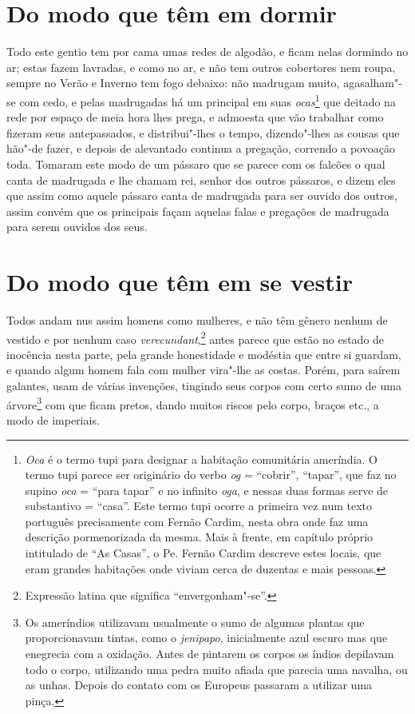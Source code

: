 \section{Do modo que têm em dormir} 
Todo este gentio tem por cama umas redes de algodão, e ficam
nelas dormindo no ar; estas fazem lavradas, e como no ar, e não tem
outros cobertores nem roupa, sempre no Verão e Inverno tem fogo
debaixo: não madrugam muito, agasalham"-se com cedo, e pelas madrugadas
há um principal em suas \textit{ocas}\footnote{ \textit{Oca} é o
termo tupi para designar a habitação comunitária ameríndia. O termo
tupi parece ser originário do verbo \textit{og} = ``cobrir'', ``tapar'',
que faz no supino \textit{oca} = ``para tapar'' e no infinito
\textit{oga}, e nessas duas formas serve de substantivo = ``casa''. 
Este termo tupi ocorre a primeira vez num texto português
precisamente com Fernão Cardim, nesta obra onde faz uma descrição
pormenorizada da mesma. Mais à frente, em capítulo próprio intitulado
de ``As Casas'', o Pe. Fernão Cardim descreve estes locais, que
eram grandes habitações onde viviam cerca de duzentas e mais pessoas.} 
que deitado na rede por espaço de meia hora lhes prega, e admoesta que
vão trabalhar como fizeram seus antepassados, e distribui"-lhes o tempo,
dizendo"-lhes as cousas que hão"-de fazer, e depois de alevantado
continua a pregação, correndo a povoação toda. Tomaram este modo de um
pássaro que se parece com os falcões o qual canta de madrugada e lhe
chamam rei, senhor dos outros pássaros, e dizem eles que assim como
aquele pássaro canta de madrugada para ser ouvido dos outros, assim
convém que os principais façam aquelas falas e pregações de madrugada
para serem ouvidos dos seus.

\section{Do modo que têm em se vestir}
Todos andam nus assim homens como mulheres, e não têm gênero
nenhum de vestido e por nenhum caso \textit{verecundant},\footnote{ Expressão latina 
que significa ``envergonham"-se''.} antes parece
que estão no estado de inocência nesta parte, pela grande honestidade
e modéstia que entre si guardam, e quando algum homem fala com mulher
vira"-lhe as costas. Porém, para saírem galantes, usam de várias
invenções, tingindo seus corpos com certo sumo de uma árvore\footnote{ Os ameríndios 
utilizavam usualmente o sumo de algumas plantas que
proporcionavam tintas, como o \textit{jenipapo}, inicialmente azul
escuro mas que enegrecia com a oxidação. Antes de pintarem os corpos os
índios depilavam todo o corpo, utilizando uma pedra muito afiada que
parecia uma navalha, ou as unhas. Depois do contato com os Europeus
passaram a utilizar uma pinça.} com que ficam pretos, dando muitos
riscos pelo corpo, braços etc., a modo de imperiais. 

